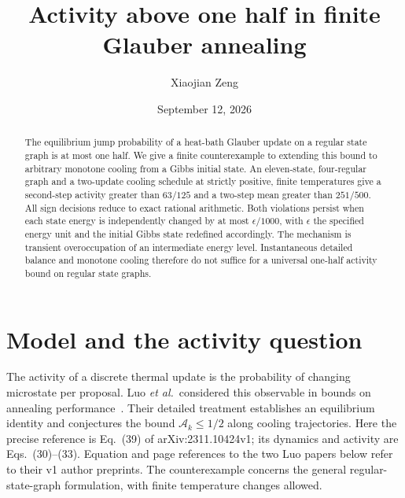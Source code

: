\documentclass[aps,pre,reprint,longbibliography,nofootinbib,floatfix]{revtex4-2}
\newcommand{\Act}{\mathcal A}
\newcommand{\eps}{\epsilon}
\begin{document}
\title{Activity above one half in finite Glauber annealing}
\author{Xiaojian Zeng}
\date{September 12, 2026}
\begin{abstract}
The equilibrium jump probability of a heat-bath Glauber update on a regular
state graph is at most one half. We give a finite counterexample to extending
this bound to arbitrary monotone cooling from a Gibbs initial state.
An eleven-state, four-regular graph and a two-update cooling schedule at
strictly positive, finite temperatures give a second-step activity greater than $63/125$ and
a two-step mean greater than $251/500$. All sign decisions reduce to exact
rational arithmetic. Both violations persist when each state energy is
independently changed by at most $\eps/1000$, with $\eps$ the specified energy
unit and the initial Gibbs state redefined accordingly. The mechanism is
transient overoccupation of an intermediate energy level. Instantaneous
detailed balance and monotone cooling therefore do not suffice for a universal
one-half activity bound on regular state graphs.
\end{abstract}
\maketitle

\section{Model and the activity question}
The activity of a discrete thermal update is the probability of changing
microstate per proposal. Luo \textit{et al.}\ considered this observable in
bounds on annealing performance~\cite{LuoDetailed,LuoLetter}.
Their detailed treatment establishes an equilibrium identity and conjectures
the bound $\Act_k\leq 1/2$ along cooling trajectories. Here the precise
reference is Eq.~(39) of arXiv:2311.10424v1; its dynamics and activity are
Eqs.~(30)--(33). Equation and page references to the two Luo papers below
refer to their v1 author preprints. The counterexample concerns the general
regular-state-graph formulation, with finite temperature changes allowed.
\end{document}
